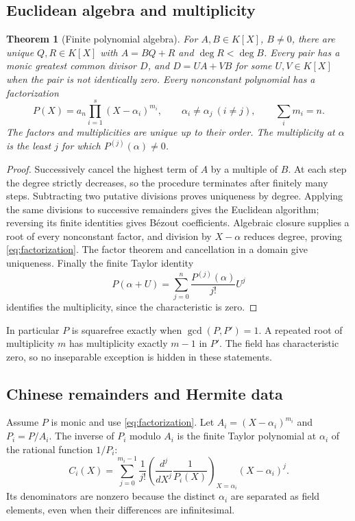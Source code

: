 \documentclass[11pt,letterpaper]{article}
\numberwithin{equation}{section}
\newtheorem{theorem}{Theorem}[section]
\theoremstyle{definition}
\theoremstyle{remark}
\begin{document}
\subsection{Euclidean algebra and multiplicity}
\begin{theorem}[Finite polynomial algebra]\label{thm:euclidean}
For $A,B\in K[X]$, $B\ne0$, there are unique $Q,R\in K[X]$ with
$A=BQ+R$ and $\deg R<\deg B$. Every pair has a monic greatest common
divisor $D$, and $D=UA+VB$ for some $U,V\in K[X]$ when the pair is not
identically zero. Every nonconstant polynomial has a factorization
\begin{equation}\label{eq:factorization}
 P(X)=a_n\prod_{i=1}^s(X-\alpha_i)^{m_i},
 \qquad \alpha_i\ne\alpha_j\ (i\ne j),\qquad \sum_i m_i=n.
\end{equation}
The factors and multiplicities are unique up to their order. The
multiplicity at $\alpha$ is the least $j$ for which $P^{(j)}(\alpha)\ne0$.
\end{theorem}
\begin{proof}
Successively cancel the highest term of $A$ by a multiple of $B$. At each
step the degree strictly decreases, so the procedure terminates after
finitely many steps. Subtracting two putative divisions proves uniqueness
by degree. Applying the same divisions to successive remainders gives the
Euclidean algorithm; reversing its finite identities gives B\'ezout
coefficients. Algebraic closure supplies a root of every nonconstant
factor, and division by $X-\alpha$ reduces degree, proving
\eqref{eq:factorization}. The factor theorem and cancellation in a domain
give uniqueness. Finally the finite Taylor identity
\[
 P(\alpha+U)=\sum_{j=0}^n\frac{P^{(j)}(\alpha)}{j!}U^j
\]
identifies the multiplicity, since the characteristic is zero.
\end{proof}

In particular $P$ is squarefree exactly when $\gcd(P,P')=1$. A repeated
root of multiplicity $m$ has multiplicity exactly $m-1$ in $P'$. The field
has characteristic zero, so no inseparable exception is hidden in these
statements.

\subsection{Chinese remainders and Hermite data}
Assume $P$ is monic and use \eqref{eq:factorization}. Let
$A_i=(X-\alpha_i)^{m_i}$ and $P_i=P/A_i$. The inverse of $P_i$ modulo $A_i$
is the finite Taylor polynomial at $\alpha_i$ of the rational function
$1/P_i$:
\begin{equation}\label{eq:inversejet}
 C_i(X)=\sum_{j=0}^{m_i-1}\frac1{j!}
 \left(\frac{d^j}{dX^j}\frac1{P_i(X)}\right)_{X=\alpha_i}
 (X-\alpha_i)^j.
\end{equation}
Its denominators are nonzero because the distinct $\alpha_i$ are separated
as field elements, even when their differences are infinitesimal.
\end{document}
